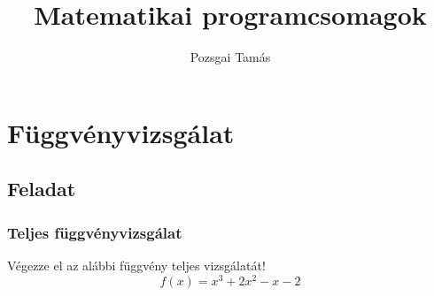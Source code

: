 \documentclass[ignorenonframetext]{beamer}
\title{Matematikai programcsomagok}
\author{Pozsgai Tamás}
\institute[Pannon Egyetem]{}
\begin{document}

\frame{\titlepage} %


\frame{
	\tableofcontents
}

\section{Függvényvizsgálat}
\subsection{Feladat}
\begin{frame}[fragile]
\frametitle{Teljes függvényvizsgálat}
Végezze el az alábbi függvény teljes vizsgálatát!
\[
f(x)=x^3+2x^2-x-2 
\]

\end{frame}
\end{document}
